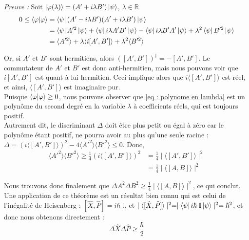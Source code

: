 \documentclass{article}
\begin{document}
\textit{Preuve :} Soit $\ket{\varphi(\lambda)} = (A' + i \lambda B')\ket{\psi}$, $\lambda \in \mathbb{R}$ \\
\begin{align}
    0 \leq \braket{\varphi | \varphi} &= \bra{\psi} (A' - i\lambda B')(A' +i\lambda B') \ket{\psi} \notag \\
    &= \bra{\psi} A'^2 \ket{\psi} + \bra{\psi} i\lambda A'B' \ket{\psi} - \bra{\psi} i\lambda B'A' \ket{\psi} + \lambda^2 \bra{\psi} B'^2 \ket{\psi} \notag \\
    &= \langle A'^2 \rangle + \lambda \langle i [A', B'] \rangle + \lambda^2 \langle B'^2 \rangle 
    \label{eq : polynome en lambda}
\end{align}

Or, si $A'$ et $B'$ sont hermitiens, alors $ \left( [A', B'] \right)^\dagger = - [A', B']$. Le commutateur de $A'$ et $B'$ est donc anti-hermitien, mais nous pouvons voir que $i [A', B']$ est quant à lui hermitien. Ceci implique alors que $i \langle [A', B'] \rangle$ est réel, et ainsi, $\langle [A',B'] \rangle$ est imaginaire pur. \\

Puisque $\braket{\varphi | \varphi} \geq 0$, nous pouvons observer que \eqref{eq : polynome en lambda} est un polynôme du second degré en la variable $\lambda$ à coefficients réels, qui est toujours positif. \\
Autrement dit, le discriminant $\Delta$ doit être plus petit ou égal à zéro car le polynôme étant positif, ne pourra avoir au plus qu'une seule racine : \\
$ \Delta = \left( i \langle [A', B'] \rangle \right)^2 - 4 \langle A'^2 \rangle \langle B'^2 \rangle \leq 0$. Donc, 
\begin{align}
    \langle A'^2 \rangle \langle B'^2 \rangle \geq \frac{1}{4} \left( i \langle [A', B'] \rangle \right)^2 &= \frac{1}{4} \mid \langle [A',B'] \rangle \mid^2 \\
    &= \frac{1}{4} \mid \langle [A,B] \rangle \mid^2 
\end{align}

Nous trouvons donc finalement que $\Delta A^2 \Delta B^2 \geq \frac{1}{4} \mid \langle [A, B] \rangle \mid^2$, ce qui conclut. \\

Une application de ce théorème est un résultat bien connu qui est celui de l'inégalité de Heisenberg : $[\hat{X}, \hat{P}] = i\hbar \; \mathbb{I}$, et $\mid \langle [\hat{X}, \hat{P}] \rangle \mid^2 = \mid \bra{\psi} i\hbar \;\mathbb{I} \ket{\psi} \mid^2 = \hbar^2$, et donc nous obtenons directement : 
\begin{equation}
    \Delta \hat{X} \Delta \hat{P} \geq \frac{\hbar}{2}
    \label{eq:Heisenberg inégalité}
\end{equation}
\end{document}
